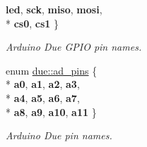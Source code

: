 \begin{DoxyCompactItemize}
{\bfseries led}, 
{\bfseries sck}, 
{\bfseries miso}, 
{\bfseries mosi}, 
\\*
{\bfseries cs0}, 
{\bfseries cs1}
 \}\begin{DoxyCompactList}\small\item\em Arduino Due G\+P\+IO pin names. \end{DoxyCompactList}
\item 
enum \hyperlink{namespacedue_a5ecc98d40585c91eabbfb14f71bd7d4c}{due\+::ad\+\_\+pins} \{ \\*
{\bfseries a0}, 
{\bfseries a1}, 
{\bfseries a2}, 
{\bfseries a3}, 
\\*
{\bfseries a4}, 
{\bfseries a5}, 
{\bfseries a6}, 
{\bfseries a7}, 
\\*
{\bfseries a8}, 
{\bfseries a9}, 
{\bfseries a10}, 
{\bfseries a11}
 \}\begin{DoxyCompactList}\small\item\em Arduino Due pin names. \end{DoxyCompactList}
\end{DoxyCompactItemize}
